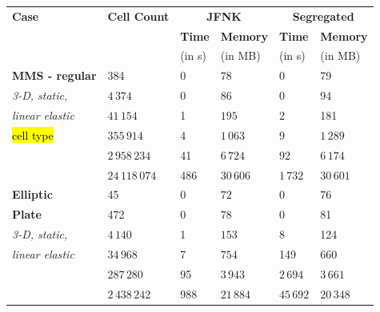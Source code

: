 \documentclass[sn-mathphys,Numbered]{sn-jnl}%
\begin{document}
\begin{table}[!htbp]
	\centering
		\begin{tabular}{ll|ll|ll}
			\hline
			\textbf{Case} & \textbf{Cell Count} & \multicolumn{2}{c|}{\textbf{JFNK}} & \multicolumn{2}{c}{\textbf{Segregated}} \\
			     &            & \textbf{Time} & \textbf{Memory} & \textbf{Time} & \textbf{Memory} \\
			     &            & (in s) & (in MB) & (in s) & (in MB) \\
			\hline 
			\textbf{MMS - regular} & 384 & 0 & $78$ 				& 0 & 79 \\
			\emph{3-D, static,}	& $4\,374$ & 0 & $86$ 			& 0 & 94 \\
			\emph{linear elastic} & $41\,154$ & 1 & $195$  		& 2 & 181 \\
			\hl{cell type}	&  $355\,914$ & 4 & $1\,063$ 		& 9 & $1\,289$ \\
				& $2\,958\,234$ & 41 & $6\,724$ 	& 92 & $6\,174$ \\
				& $24\,118\,074$ & 486 & $30\,606$ & $1\,732$ & $30\,601$ \\
			\hline
			\textbf{Elliptic} & 45 & 0 & $72$ & 0 & 76 \\
			\textbf{Plate} & 472 & 0 & $78$ & 0 & 81 \\
			\emph{3-D, static,} & $4\,140$ & 1 & $153$ & 8 & 124 \\
			\emph{linear elastic} & $34\,968$ & 7 & $754$ & 149 & 660 \\
				& $287\,280$ & 95 & $3\,943$ & $2\,694$ & $3\,661$ \\
				& $2\,438\,242$ & 988 & $21\,884$ & $45\,692$ & $20\,348$ \\
			\hline

\end{tabular}
\end{table}
\end{document}
